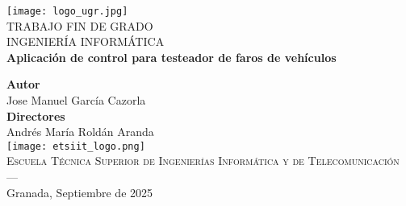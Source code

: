 \begin{titlepage}
    \newlength{\centeroffset}
    \setlength{\centeroffset}{-0.5\oddsidemargin}
    \addtolength{\centeroffset}{0.5\evensidemargin}
    \thispagestyle{empty}

    \noindent\hspace*{\centeroffset}

    \begin{minipage}{\textwidth}
        \centering

        \texttt{[image: logo\_ugr.jpg]}\\[1.4cm]

        \textsc{\Large TRABAJO FIN DE GRADO\\[0.2cm]}
        \textsc{INGENIERÍA INFORMÁTICA}\\[1cm]

        \Huge\bfseries Aplicación de control para testeador de faros de vehículos
    \end{minipage}

    \vspace{2.5cm}
    \noindent\hspace*{\centeroffset}

    \begin{minipage}{\textwidth}
        \centering

        \textbf{Autor}\\{Jose Manuel García Cazorla}\\[2.5ex]
        \textbf{Directores}\\{Andrés María Roldán Aranda}\\[2.5ex]

        \texttt{[image: etsiit\_logo.png]}\\[0.1cm]

        \textsc{Escuela Técnica Superior de Ingenierías Informática y de Telecomunicación}\\
        \textsc{---}\\
        Granada, Septiembre de 2025
    \end{minipage}
\end{titlepage}

